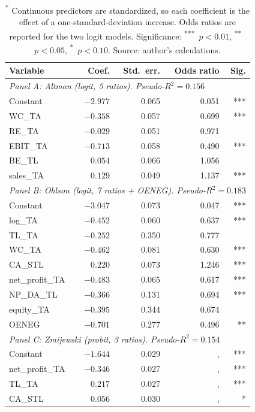 \documentclass[12pt,a4paper]{article}
\begin{document}
\begin{table}[ht]
\centering
\caption{Re-estimated econometric models at horizon H1.\textsuperscript{*}}
\label{tab:econ-coef}
\small
\begin{tabular}{lrrrr}
\toprule
Variable & Coef. & Std.\ err. & Odds ratio & Sig. \\
\midrule
\multicolumn{5}{l}{\textit{Panel A: Altman (logit, 5 ratios). Pseudo-$R^2 = 0.156$}} \\
\midrule
Constant            & $-2.977$ & 0.065 & 0.051 & *** \\
WC\_TA              & $-0.358$ & 0.057 & 0.699 & *** \\
RE\_TA              & $-0.029$ & 0.051 & 0.971 &     \\
EBIT\_TA            & $-0.713$ & 0.058 & 0.490 & *** \\
BE\_TL              & $ 0.054$ & 0.066 & 1.056 &     \\
sales\_TA           & $ 0.129$ & 0.049 & 1.137 & *** \\
\midrule
\multicolumn{5}{l}{\textit{Panel B: Ohlson (logit, 7 ratios + OENEG). Pseudo-$R^2 = 0.183$}} \\
\midrule
Constant            & $-3.047$ & 0.073 & 0.047 & *** \\
log\_TA             & $-0.452$ & 0.060 & 0.637 & *** \\
TL\_TA              & $-0.252$ & 0.350 & 0.777 &     \\
WC\_TA              & $-0.462$ & 0.081 & 0.630 & *** \\
CA\_STL             & $ 0.220$ & 0.073 & 1.246 & *** \\
net\_profit\_TA     & $-0.483$ & 0.065 & 0.617 & *** \\
NP\_DA\_TL          & $-0.366$ & 0.131 & 0.694 & *** \\
equity\_TA          & $-0.395$ & 0.344 & 0.674 &     \\
OENEG               & $-0.701$ & 0.277 & 0.496 & **  \\
\midrule
\multicolumn{5}{l}{\textit{Panel C: Zmijewski (probit, 3 ratios). Pseudo-$R^2 = 0.154$}} \\
\midrule
Constant            & $-1.644$ & 0.029 &,   & *** \\
net\_profit\_TA     & $-0.346$ & 0.027 &,   & *** \\
TL\_TA              & $ 0.217$ & 0.027 &,   & *** \\
CA\_STL             & $ 0.056$ & 0.030 &,   & *   \\
\bottomrule
\end{tabular}
\caption*{\footnotesize \textsuperscript{*} Continuous predictors are standardized, so each
coefficient is the effect of a one-standard-deviation increase. Odds ratios are
reported for the two logit models. Significance: \textsuperscript{***}~$p<0.01$,
\textsuperscript{**}~$p<0.05$, \textsuperscript{*}~$p<0.10$. Source: author's
calculations.}
\end{table}
\end{document}
